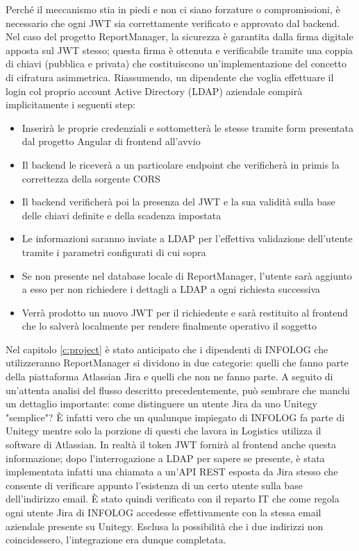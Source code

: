 Perché il meccanismo stia in piedi e non ci siano forzature o compromissioni, è necessario che ogni JWT sia correttamente verificato e approvato dal backend.
Nel caso del progetto ReportManager, la sicurezza è garantita dalla firma digitale apposta sul JWT stesso; questa firma è ottenuta e verificabile tramite una coppia di chiavi
(pubblica e privata) che costituiscono un'implementazione del concetto di cifratura asimmetrica.
Riassumendo, un dipendente che voglia effettuare il login col proprio account Active Directory (LDAP) aziendale compirà implicitamente i seguenti step:
\begin{itemize}
    \item Inserirà le proprie credenziali e sottometterà le stesse tramite form presentata dal progetto Angular di frontend all'avvio
    \item Il backend le riceverà a un particolare endpoint che verificherà in primis la correttezza della sorgente CORS
    \item Il backend verificherà poi la presenza del JWT e la sua validità sulla base delle chiavi definite e della scadenza impostata
    \item Le informazioni saranno inviate a LDAP per l'effettiva validazione dell'utente tramite i parametri configurati di cui sopra
    \item Se non presente nel database locale di ReportManager, l'utente sarà aggiunto a esso per non richiedere i dettagli a LDAP a ogni richiesta successiva
    \item Verrà prodotto un nuovo JWT per il richiedente e sarà restituito al frontend che lo salverà localmente per rendere finalmente operativo il soggetto
\end{itemize}
Nel capitolo \ref{c:project} è stato anticipato che i dipendenti di INFOLOG che utilizzeranno ReportManager si dividono in due categorie: quelli che fanno parte della piattaforma
Atlassian Jira e quelli che non ne fanno parte.
A seguito di un'attenta analisi del flusso descritto precedentemente, può sembrare che manchi un dettaglio importante: come distinguere un utente Jira da uno Unitegy "semplice"?
È infatti vero che un qualunque impiegato di INFOLOG fa parte di Unitegy mentre solo la porzione di questi che lavora in Logistics utilizza il software di Atlassian.
In realtà il token JWT fornirà al frontend anche questa informazione; dopo l'interrogazione a LDAP per sapere se presente, è stata implementata infatti
una chiamata a un'API REST esposta da Jira stesso che consente di verificare appunto l'esistenza di un certo utente sulla base dell'indirizzo email.
È stato quindi verificato con il reparto IT che come regola ogni utente Jira di INFOLOG accedesse effettivamente con la stessa email aziendale presente su Unitegy.
Esclusa la possibilità che i due indirizzi non coincidessero, l'integrazione era dunque completata.

